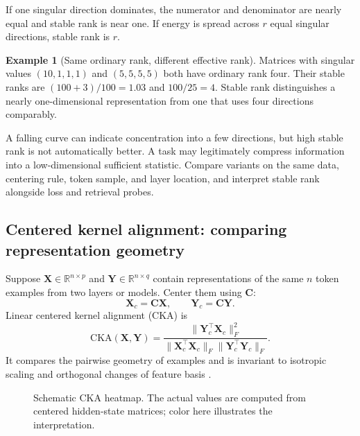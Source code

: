 \documentclass[11pt,a4paper]{article}
\theoremstyle{definition}
\newtheorem{example}{Example}[section]
\theoremstyle{plain}
\newcommand{\mC}{\bm{C}}
\newcommand{\mX}{\bm{X}}
\newcommand{\mY}{\bm{Y}}
\newcommand{\reals}{\mathbb{R}}
\begin{document}
If one singular direction dominates, the numerator and denominator are nearly equal and stable rank is near one. If energy is spread across $r$ equal singular directions, stable rank is $r$.

\begin{example}[Same ordinary rank, different effective rank]
Matrices with singular values $(10,1,1,1)$ and $(5,5,5,5)$ both have ordinary rank four. Their stable ranks are $(100+3)/100=1.03$ and $100/25=4$. Stable rank distinguishes a nearly one-dimensional representation from one that uses four directions comparably.
\end{example}

A falling curve can indicate concentration into a few directions, but high stable rank is not automatically better. A task may legitimately compress information into a low-dimensional sufficient statistic. Compare variants on the same data, centering rule, token sample, and layer location, and interpret stable rank alongside loss and retrieval probes.

\subsection{Centered kernel alignment: comparing representation geometry}
\label{sec:cka}

Suppose $\mX\in\reals^{n\times p}$ and $\mY\in\reals^{n\times q}$ contain representations of the same $n$ token examples from two layers or models. Center them using $\mC$:
\begin{equation}
    \mX_c=\mC\mX,
    \qquad
    \mY_c=\mC\mY.
\end{equation}
Linear centered kernel alignment (CKA) is
\begin{equation}\label{eq:cka}
    \mathrm{CKA}(\mX,\mY)
    =\frac{\|\mY_c^\top\mX_c\|_F^2}
           {\|\mX_c^\top\mX_c\|_F
            \|\mY_c^\top\mY_c\|_F}.
\end{equation}
It compares the pairwise geometry of examples and is invariant to isotropic scaling and orthogonal changes of feature basis \cite{kornblith2019cka}.

\begin{figure}[H]
\centering
{}
\caption{Schematic CKA heatmap. The actual values are computed from centered hidden-state matrices; color here illustrates the interpretation.}
\label{fig:cka-heatmap}
\end{figure}
\end{document}
